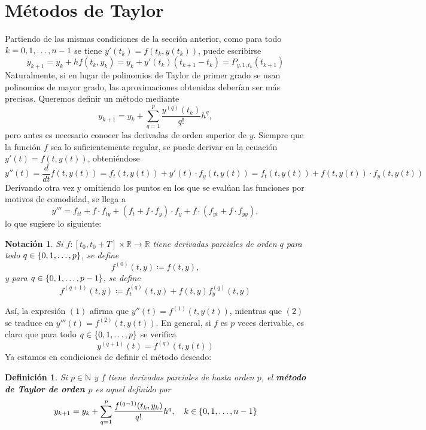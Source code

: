 \documentclass[11pt]{report}
\theoremstyle{mytheorem}
\theoremstyle{mydefinition}
\newtheorem{definition}{Definición}
\theoremstyle{myexample}
\newtheorem*{notation}{Notación}
\newenvironment{cdefinition} %
  {\begin{mdframed}[
        linewidth=3pt,
        linecolor=c1,
        bottomline=false,
        topline=false,
        rightline=false,
        innerrightmargin=0pt,
        innertopmargin=0pt,
        innerbottommargin=0pt,
        innerleftmargin=1em, %
        skipabove=\baselineskip]
    \begin{definition}}
  {\end{definition}\end{mdframed}}
\newcommand{\R}{\mathbb R}
\newcommand{\N}{\mathbb N}
\newcommand{\mybf}[1]{\boldmath\textbf{\color{c1}#1}\unboldmath}
\begin{document}
\section{Métodos de Taylor}

Partiendo de las mismas condiciones de la sección anterior, como para todo $k =0,1,\mathellipsis,n-1$ se tiene $y'(t_k)=f(t_k,y(t_k))$, puede escribirse
\[y_{k+1}=y_k+hf(t_k,y_k)=y_k+y'(t_k)(t_{k+1}-t_k) = P_{y,1,t_k}(t_{k+1})\]
Naturalmente, si en lugar de polinomios de Taylor de primer grado se usan polinomios de mayor grado, las aproximaciones obtenidas deberían ser más precisas. Queremos definir un método mediante
\[y_{k+1} = y_k+\sum_{q=1}^p \frac{y^{(q)}(t_k)}{q!}h^q,\]
pero antes es necesario conocer las derivadas de orden superior de $y$. Siempre que la función $f$ sea lo suficientemente regular, se puede derivar en la ecuación $y'(t)=f(t,y(t))$, obteniéndose
\begin{equation}
    y''(t)=\frac{d}{dt}f(t,y(t)) = f_t(t,y(t))+y'(t)\cdot f_y(t,y(t)) = f_t(t,y(t))+f(t,y(t)) \cdot f_y(t,y(t))
\end{equation}
Derivando otra vez y omitiendo los puntos en los que se evalúan las funciones por motivos de comodidad, se llega a
\begin{equation}y''' =  f_{tt}+f \cdot f_{ty}+(f_t+f\cdot f_y) \cdot f_y + f \cdot (f_{yt}+f\cdot f_{yy}), \end{equation}
lo que sugiere lo siguiente:

\begin{notation}
Si $f \colon [t_0,t_0+T] \times \R \to \R$ tiene derivadas parciales de orden $q$ para todo $q \in \{0,1,\mathellipsis,p\}$, se define
\[f^{(0)}(t,y) \coloneqq f(t,y),\]
y para $q \in \{ 0,1,\mathellipsis,p-1\}$, se define
\[f^{(q+1)}(t,y) \coloneqq f_t^{(q)}(t,y)+f(t,y)f_y^{(q)}(t,y)\]
\end{notation}

Así, la expresión $(1)$ afirma que $y''(t)=f^{(1)}(t,y(t))$, mientras que $(2)$ se traduce en $y'''(t)=f^{(2)}(t,y(t))$. En general, si $f$ es $p$ veces derivable, es claro que para todo $q \in \{0,1,\mathellipsis,p\}$ se verifica
\[y^{(q+1)}(t) = f^{(q)}(t,y(t))\]
Ya estamos en condiciones de definir el método deseado:
\begin{cdefinition}
Si $p \in \N$ y $f$ tiene derivadas parciales de hasta orden $p$, el \mybf{método de Taylor de orden $p$} es aquel definido por
\[
    y_{k+1} = y_k+\sum_{q=1}^p \frac{f^{(q-1)}(t_k,y_k)}{q!}h^{q}, \quad k \in \{0,1,\mathellipsis,n-1\}
\]
\end{cdefinition}
\end{document}
